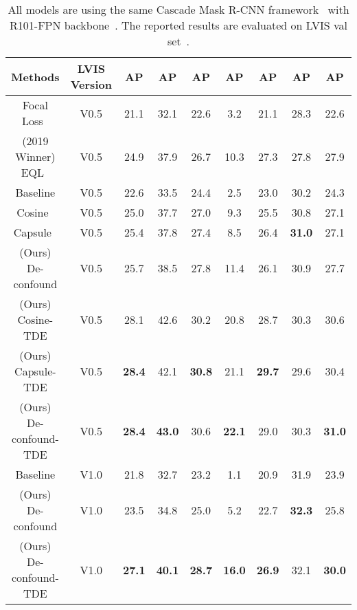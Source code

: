 \documentclass{article}
\begin{document}
\begin{table}
\centering
\scalebox{0.85}
{
\begin{tabular}{c| c | c  c  c | c  c  c | c}
\hline
\hline
Methods & LVIS Version & AP & AP & AP & AP & AP & AP & AP \\ 
\hline 
Focal Loss~\cite{lin2017focal} & V0.5 & 21.1 & 32.1 & 22.6 & 3.2 & 21.1 & 28.3 & 22.6    \\
(2019 Winner) EQL~\cite{tan2020equalization} & V0.5 & 24.9 & 37.9 & 26.7 & 10.3 & 27.3 & 27.8 & 27.9 \\
\hline
Baseline & V0.5 & 22.6 & 33.5 & 24.4 & 2.5 & 23.0 & 30.2 & 24.3    \\
Cosine~\cite{gidaris2018dynamic, qi2018low} & V0.5 & 25.0 & 37.7 & 27.0 & 9.3 & 25.5 & 30.8 & 27.1    \\
Capsule~\cite{liu2019large, sabour2017dynamic} & V0.5 & 25.4 & 37.8 & 27.4 & 8.5 & 26.4 & \textbf{31.0} & 27.1    \\
(Ours) De-confound & V0.5 & 25.7 & 38.5 & 27.8 & 11.4 & 26.1 & 30.9 & 27.7    \\
(Ours) Cosine-TDE & V0.5 & 28.1 & 42.6 & 30.2 & 20.8 & 28.7 & 30.3 & 30.6    \\
(Ours) Capsule-TDE & V0.5 & \textbf{28.4} & 42.1 & \textbf{30.8} & 21.1 & \textbf{29.7} & 29.6 & 30.4    \\
(Ours) De-confound-TDE & V0.5 & \textbf{28.4} & \textbf{43.0} & 30.6 & \textbf{22.1} & 29.0 & 30.3 & \textbf{31.0}    \\
\hline
Baseline & V1.0 & 21.8 & 32.7 & 23.2 & 1.1 & 20.9 & 31.9 & 23.9 \\
(Ours) De-confound & V1.0 & 23.5 & 34.8 & 25.0 & 5.2 & 22.7 & \textbf{32.3} & 25.8    \\
(Ours) De-confound-TDE & V1.0 & \textbf{27.1} & \textbf{40.1} & \textbf{28.7} & \textbf{16.0} & \textbf{26.9} & 32.1 & \textbf{30.0}    \\
\hline
\hline
\end{tabular}
}
\caption{All models are using the same Cascade Mask R-CNN framework~\cite{cai2018cascade} with R101-FPN backbone~\cite{lin2017feature}. The reported results are evaluated on LVIS val set~\cite{gupta2019lvis}.}
\label{tab:3}
\vspace{-5mm}
\end{table}
\end{document}
